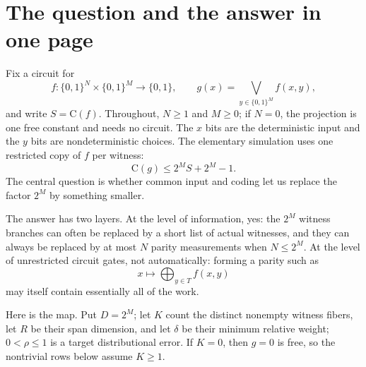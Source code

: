 \documentclass[11pt]{article}
\theoremstyle{definition}
\theoremstyle{remark}
\newcommand{\bits}{\{0,1\}}
\newcommand{\C}{\mathrm C}
\begin{document}
\clearpage

\section{The question and the answer in one page}

Fix a circuit for
\[
  f:\bits^N\times\bits^M\longrightarrow\bits,
  \qquad
  g(x)=\bigvee_{y\in\bits^M}f(x,y),
  \tag{1.1}\label{eq:projection}
\]
and write $S=\C(f)$.  Throughout, $N\ge1$ and $M\ge0$; if $N=0$, the
projection is one free constant and needs no circuit.  The $x$ bits are the
deterministic input and the $y$ bits are nondeterministic choices.  The
elementary simulation uses one
restricted copy of $f$ per witness:
\[
  \C(g)\le 2^M S+2^M-1.
  \tag{1.2}\label{eq:replication-intro}
\]
The central question is whether common input and coding let us replace the
factor $2^M$ by something smaller.

The answer has two layers.  At the level of information, yes: the $2^M$
witness branches can often be replaced by a short list of actual witnesses,
and they can always be replaced by at most $N$ parity measurements when
$N\le2^M$.  At the level of unrestricted circuit gates, not automatically:
forming a parity such as
\[
  x\longmapsto\bigoplus_{y\in T}f(x,y)
  \tag{1.3}\label{eq:parity-aggregate}
\]
may itself contain essentially all of the work.

Here is the map.  Put $D=2^M$; let $K$ count the distinct nonempty witness
fibers, let $R$ be their span dimension, and let $\delta$ be their minimum
relative weight; $0<\rho\le1$ is a target distributional error.  If $K=0$,
then $g=0$ is free, so the nontrivial rows below assume $K\ge1$.
\end{document}
